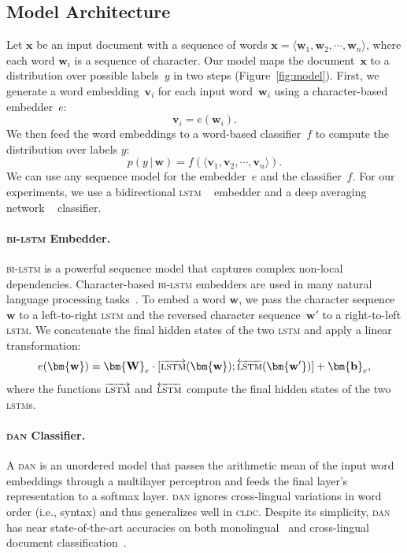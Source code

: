 \documentclass[letterpaper]{article} %
\newcommand{\citep}{\cite}
\newcommand{\g}{\, | \,}
\newcommand{\abr}[1]{\textsc{#1}}
\newcommand{\vect}[1]{\bm{\mathbf{#1}}}
\begin{document}
\subsection{Model Architecture}

Let $\vect{x}$ be an input document with a sequence of words $\vect{x} =
\langle \vect{w}_1, \vect{w}_2, \cdots, \vect{w}_n \rangle$, where each word
$\vect{w}_i$ is a sequence of character.
Our model maps the document~$\vect{x}$ to a distribution over possible
labels~$y$ in two steps (Figure~\ref{fig:model}).
First, we generate a word embedding~$\vect{v}_i$ for each input
word~$\vect{w}_i$ using a character-based embedder~$e$:
\begin{equation}
  \vect{v}_i = e(\vect{w}_i).
\end{equation}
We then feed the word embeddings to a word-based classifier~$f$ to compute the
distribution over labels $y$:
\begin{equation}
  p(y \g \vect{w}) = f\left( \langle \vect{v}_1, \vect{v}_2, \cdots, \vect{v}_n \rangle \right ).
\end{equation}
We can use any sequence model for the embedder~$e$ and the classifier~$f$.  For
our experiments, we use a bidirectional \abr{lstm}
~\citep[\abr{bi-lstm}]{graves-05} embedder and a deep averaging network
~\citep[\abr{dan}]{iyyer-15-fixed} classifier.

\paragraph{\abr{bi-lstm} Embedder.}
\abr{bi-lstm} is a powerful sequence model that captures complex non-local
dependencies.  Character-based \abr{bi-lstm} embedders are used in
many natural language processing
tasks~\citep{ling-15a,ballesteros-15,lample-16}.
To embed a word $\vect{w}$, we pass the character sequence~$\vect{w}$ to a
left-to-right \abr{lstm} and the reversed character sequence~$\vect{w'}$ to a
right-to-left \abr{lstm}.  We concatenate the final hidden states of the two
\abr{lstm} and apply a linear transformation:
\begin{equation}
  e(\vect{w}) = \vect{W}_e \cdot [\overrightarrow{\text{\abr{lstm}}}(\vect{w});
  \overleftarrow{\text{\abr{lstm}}}(\vect{w'})] + \vect{b}_e,
\end{equation}
where the functions $\overrightarrow{\text{\abr{lstm}}}$ and
$\overleftarrow{\abr{lstm}}$ compute the final hidden states of the two
\abr{lstm}s.

\paragraph{\abr{dan} Classifier.}
A \abr{dan} is an unordered model that passes the arithmetic mean of the input
word embeddings through a multilayer perceptron and feeds the final layer's
representation to a softmax layer.
\abr{dan} ignores cross-lingual variations in word order (i.e., syntax) and
thus generalizes well in \abr{cldc}.
Despite its simplicity, \abr{dan} has near state-of-the-art accuracies on both
monolingual~\citep{iyyer-15-fixed} and cross-lingual document
classification~\citep{chen-18}.
\end{document}
